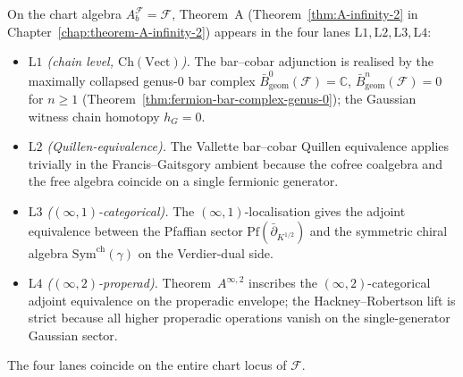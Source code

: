 \begin{remark}
\label{rem:fermion-theorem-A-four-lanes}
On the chart algebra $A_b^{\mathcal F}=\mathcal F$, Theorem~A
(Theorem~\ref{thm:A-infinity-2} in
Chapter~\ref{chap:theorem-A-infinity-2}) appears in the four lanes
$\mathrm{L}1,\mathrm{L}2,\mathrm{L}3,\mathrm{L}4$:
\begin{itemize}
\item \emph{$\mathrm{L}1$ (chain level, $\mathrm{Ch}(\mathrm{Vect})$).}
The bar--cobar adjunction is realised by the maximally collapsed
genus-0 bar complex $\bar{B}^0_{\mathrm{geom}}(\mathcal F)=\mathbb C$,
$\bar{B}^n_{\mathrm{geom}}(\mathcal F)=0$ for $n\ge 1$
(Theorem~\ref{thm:fermion-bar-complex-genus-0}); the Gaussian
witness chain homotopy $h_G=0$.
\item \emph{$\mathrm{L}2$ (Quillen-equivalence).}
The Vallette bar--cobar Quillen equivalence applies trivially in
the Francis--Gaitsgory ambient because the cofree coalgebra and the
free algebra coincide on a single fermionic generator.
\item \emph{$\mathrm{L}3$ ($(\infty,1)$-categorical).}
The $(\infty,1)$-localisation gives the adjoint equivalence between
the Pfaffian sector $\mathrm{Pf}(\bar\partial_{K^{1/2}})$ and the
symmetric chiral algebra $\mathrm{Sym}^{\mathrm{ch}}(\gamma)$ on
the Verdier-dual side.
\item \emph{$\mathrm{L}4$ ($(\infty,2)$-properad).}
Theorem~$A^{\infty,2}$ inscribes the $(\infty,2)$-categorical adjoint
equivalence on the properadic envelope; the Hackney--Robertson lift
is strict because all higher properadic operations vanish on the
single-generator Gaussian sector.
\end{itemize}
The four lanes coincide on the entire chart locus of $\mathcal F$.
\end{remark}


